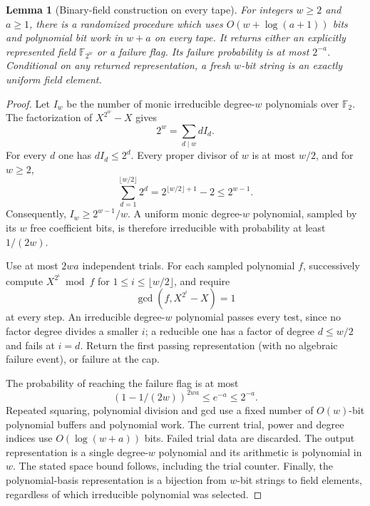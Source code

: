 \documentclass[11pt,letterpaper]{article}
\newtheorem{lemma}[theorem]{Lemma}
\numberwithin{equation}{section}
\begin{document}
\begin{lemma}[Binary-field construction on every tape]
\label{lem:bounded-binary-field}
For integers $w\ge2$ and $a\ge1$, there is a randomized procedure which uses $O(w+\log(a+1))$ bits and polynomial bit work in $w+a$ on every tape.
It returns either an explicitly represented field $\mathbb F_{2^w}$ or a failure flag.
Its failure probability is at most $2^{-a}$.
Conditional on any returned representation, a fresh $w$-bit string is an exactly uniform field element.
\end{lemma}
\begin{proof}
Let $I_w$ be the number of monic irreducible degree-$w$ polynomials over $\mathbb F_2$.
The factorization of $X^{2^w}-X$ gives
\[
 2^w=\sum_{d\mid w} dI_d.
\]
For every $d$ one has $dI_d\le2^d$.
Every proper divisor of $w$ is at most $w/2$, and for $w\ge2$,
\[
 \sum_{d=1}^{\lfloor w/2\rfloor}2^d
 =2^{\lfloor w/2\rfloor+1}-2\le2^{w-1}.
\]
Consequently, $I_w\ge2^{w-1}/w$.
A uniform monic degree-$w$ polynomial, sampled by its $w$ free coefficient bits, is therefore irreducible with probability at least $1/(2w)$.

Use at most $2wa$ independent trials.
For each sampled polynomial $f$, successively compute $X^{2^i}\bmod f$ for $1\le i\le\lfloor w/2\rfloor$, and require
\[
 \gcd(f,X^{2^i}-X)=1
\]
at every step.
An irreducible degree-$w$ polynomial passes every test, since no factor degree divides a smaller $i$; a reducible one has a factor of degree $d\le w/2$ and fails at $i=d$.
Return the first passing representation (with no algebraic failure event), or failure at the cap.

The probability of reaching the failure flag is at most
\[
 (1-1/(2w))^{2wa}\le e^{-a}\le2^{-a}.
\]
Repeated squaring, polynomial division and gcd use a fixed number of $O(w)$-bit polynomial buffers and polynomial work.
The current trial, power and degree indices use $O(\log(w+a))$ bits.
Failed trial data are discarded.
The output representation is a single degree-$w$ polynomial and its arithmetic is polynomial in $w$.
The stated space bound follows, including the trial counter.
Finally, the polynomial-basis representation is a bijection from $w$-bit strings to field elements, regardless of which irreducible polynomial was selected.
\end{proof}
\end{document}
